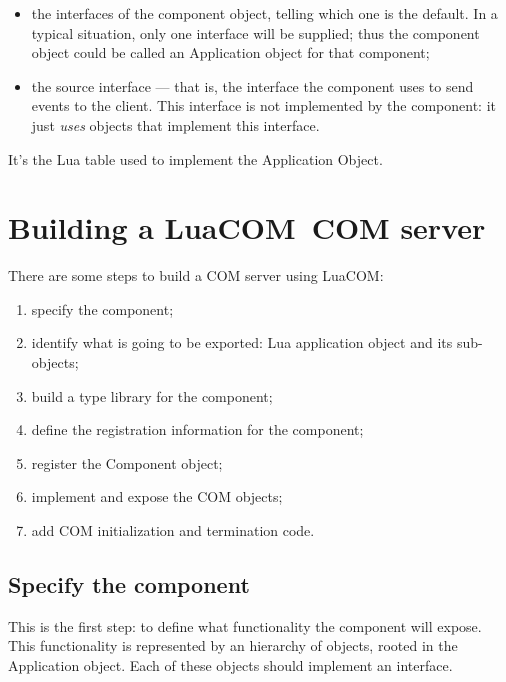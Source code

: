 \documentclass[11pt,a4paper,english]{report}
\newcommand{\techname}[1]{\mbox{#1}}
\newcommand{\luacom}{\techname{LuaCOM}}
\begin{document}
\begin{description}
\begin{itemize}
  \item the interfaces of the component object, telling which one is
  the default. In a typical situation, only one interface will be
  supplied; thus the component object could be called an Application
  object for that component;

  \item the source interface --- that is, the interface the component
  uses to send events to the client. This interface is not implemented
  by the component: it just \emph{uses} objects that implement this
  interface.

  \end{itemize}

\item [Lua Application Object] It's the Lua table used to implement
the Application Object.

\end{description}


\section{Building a \luacom\ COM server}

There are some steps to build a COM server using \luacom:

\begin{enumerate}
\item specify the component;
\item identify what is going to be exported: Lua application object
and its sub-objects;
\item build a type library for the component;
\item define the registration information for the component;
\item register the Component object;
\item implement and expose the COM objects;
\item add COM initialization and termination code.
\end{enumerate}


\subsection{Specify the component}

This is the first step: to define what functionality the component
will expose. This functionality is represented by an hierarchy of
objects, rooted in the Application object. Each of these objects
should implement an interface.
\end{document}
